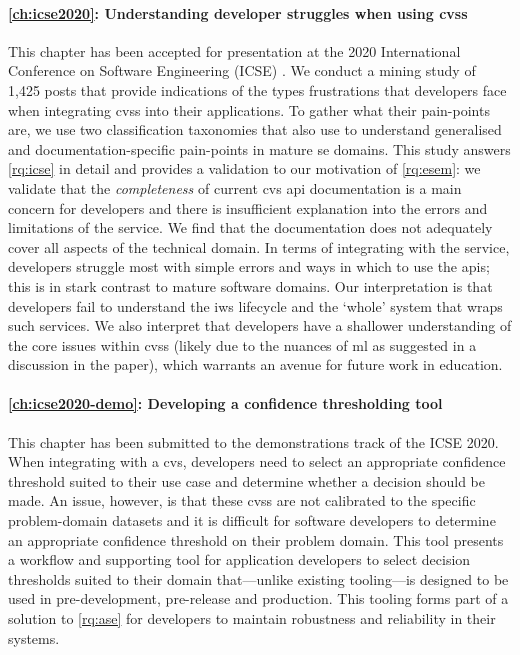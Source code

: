 \paragraph{\cref{ch:icse2020}: Understanding developer struggles when using \glspl{cvs}} This chapter has been accepted for presentation at the 2020 International Conference on Software Engineering (ICSE) \citep{Cummaudo:2019vi}. We conduct a mining study of 1,425  posts that provide indications of the types frustrations that developers face when integrating \glspl{cvs} into their applications. To gather what their pain-points are, we use two classification taxonomies that also use  to understand generalised and documentation-specific pain-points in mature \gls{se} domains. This study answers \ref{rq:icse} in detail and provides a validation to our motivation of \ref{rq:esem}: we validate that the \textit{completeness} of current \gls{cvs} \gls{api} documentation is a main concern for developers and there is insufficient explanation into the errors and limitations of the service. We find that the documentation does not adequately cover all aspects of the technical domain. In terms of integrating with the service, developers struggle most with simple errors and ways in which to use the \glspl{api}; this is in stark contrast to mature software domains. Our interpretation is that developers fail to understand the \gls{iws} lifecycle and the `whole' system that wraps such services. We also interpret that developers have a shallower understanding of the core issues within \glspl{cvs} (likely due to the nuances of \gls{ml} as suggested in a discussion in the paper), which warrants an avenue for future work in  education.

\paragraph{\cref{ch:icse2020-demo}: Developing a confidence thresholding tool} This chapter has been submitted to the demonstrations track of the ICSE 2020. When integrating with a \gls{cvs}, developers need to select an appropriate confidence threshold suited to their use case and determine whether a decision should be made. An issue, however, is that these \glspl{cvs} are not calibrated to the specific problem-domain datasets and it is difficult for software developers to determine an appropriate confidence threshold on their problem domain. This tool presents a workflow and supporting tool for application developers to select decision thresholds suited to their domain that---unlike existing tooling---is designed to be used in pre-development, pre-release and production. This tooling forms part of a solution to \ref{rq:ase} for developers to maintain robustness and reliability in their systems.

